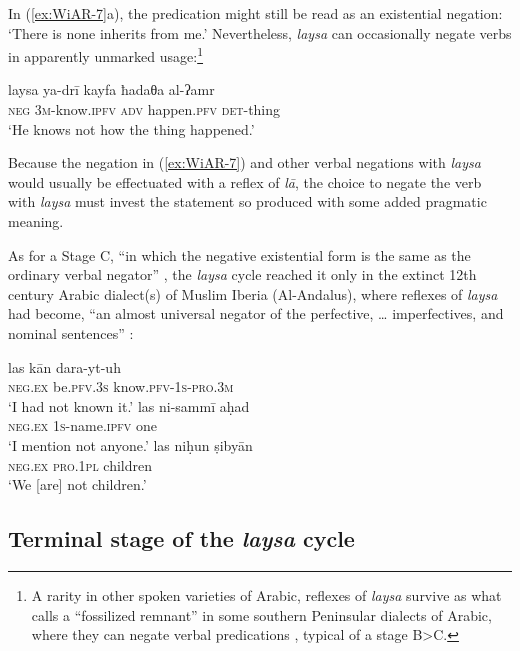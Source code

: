\documentclass[output=paper]{langsci/langscibook}
\begin{document}
In (\ref{ex:WiAR-7}a), the predication might still be read as an existential negation: ‘There is none inherits from me.’ Nevertheless, \textit{laysa} can occasionally negate verbs in apparently unmarked usage:\footnote{A rarity in other spoken varieties of Arabic, reflexes of \textit{laysa} survive as what \citet[26]{holes2006a} calls a “fossilized remnant” in some southern Peninsular dialects of Arabic, where they can negate verbal predications \citep[142-144]{al-azraqi1998a}, typical of a stage B>C.}

\ea \label{ex:WiAR-8}
	\gll laysa ya-drī kayfa ħadaθa al-ʔamr \\
	\textsc{neg} \textsc{3m}-know.\textsc{ipfv} \textsc{adv} happen.\textsc{pfv} \textsc{det}-thing\\
	\glt ‘He knows not how the thing happened.’ \citep[28]{kanafani2006a}
\z

Because the negation in (\ref{ex:WiAR-7}) and other verbal negations with \textit{laysa} would usually be effectuated with a reflex of \textit{lā}, the choice to negate the verb with \textit{laysa} must invest the statement so produced with some added pragmatic meaning.

As for a Stage C, “in which the negative existential form is the same as the ordinary verbal negator” \citep[11]{Croft1991}, the \textit{laysa} cycle reached it only in the extinct 12th century Arabic dialect(s) of Muslim Iberia (Al-Andalus), where reflexes of \textit{laysa} had become, “an almost universal negator of the perfective, … imperfectives, and nominal sentences” \citep{corriente2013a}:

\ea \label{ex:WiAR-9}
  \ea
  	\gll las kān dara-yt-uh\\
  	\textsc{neg.ex} be.\textsc{pfv.3s} know.\textsc{pfv-1s-pro.3m}\\
  	\glt ‘I had not known it.’ \citep[126]{corriente2013a}
  \ex
  	\gll las ni-sammī aḥad\\
  	\textsc{neg.ex} \textsc{1s}-name.\textsc{ipfv} one\\
    \glt ‘I mention not anyone.’ \citep[126]{corriente2013a}
  \ex
  	\gll las niḥun ṣibyān\\
  	\textsc{neg.ex} \textsc{pro.1pl} children\\
  	\glt ‘We [are] not children.’ \citep[126]{corriente2013a}
\z \z

\subsection{Terminal stage of the \textit{laysa} cycle} \label{s:WiAR-2.4}
\end{document}
